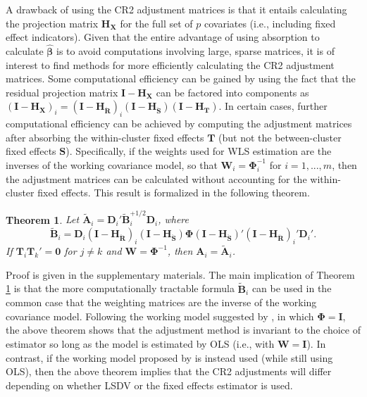 \documentclass[12pt]{article}\usepackage[]{graphicx}\usepackage[]{color}
\newtheorem{thm}{Theorem}
\newcommand{\bm}{\mathbf}
\newcommand{\bs}{\boldsymbol}
\begin{document}
A drawback of using the CR2 adjustment matrices is that it entails calculating the projection matrix $\bm{H_X}$ for the full set of $p$ covariates (i.e., including fixed effect indicators). 
Given that the entire advantage of using absorption to calculate $\hat{\bs\beta}$ is to avoid computations involving large, sparse matrices, it is of interest to find methods for more efficiently calculating the CR2 adjustment matrices. 
Some computational efficiency can be gained by using the fact that the residual projection matrix $\bm{I} - \bm{H_X}$ can be factored into components as $\left(\bm{I} - \bm{H_X}\right)_i = \left(\bm{I} - \bm{H_{\ddot{R}}}\right)_i \left(\bm{I} - \bm{H_{\ddot{S}}}\right) \left(\bm{I} - \bm{H_T}\right)$.
In certain cases, further computational efficiency can be achieved by computing the adjustment matrices after absorbing the within-cluster fixed effects $\bm{T}$ (but not the between-cluster fixed effects $\bm{S}$). 
Specifically, if the weights used for WLS estimation are the inverses of the working covariance model, so that $\bm{W}_i = \bs\Phi_i^{-1}$ for $i = 1,...,m$, then the adjustment matrices can be calculated without accounting for the within-cluster fixed effects. 
This result is formalized in the following theorem.  

\begin{thm}
\label{thm:absorb}
Let $\bm{\tilde{A}}_i = \bm{D}_i'\bm{\tilde{B}}_i^{+1/2} \bm{D}_i$, where 
\begin{equation}
\label{eq:CR2_B_tilde}
\bm{\tilde{B}}_i = \bm{D}_i\left(\bm{I} - \bm{H_{\ddot{R}}}\right)_i \left(\bm{I} - \bm{H_{\ddot{S}}}\right) \bs\Phi \left(\bm{I} - \bm{H_{\ddot{S}}}\right)' \left(\bm{I} - \bm{H_{\ddot{R}}}\right)_i' \bm{D}_i'.
\end{equation}
If $\bm{T}_i \bm{T}_k' = \bm{0}$ for $j \neq k$ and $\bm{W} = \bs\Phi^{-1}$, then $\bm{A}_i = \bm{\tilde{A}}_i$. 
\end{thm}

Proof is given in the supplementary materials.
The main implication of Theorem \ref{thm:absorb} is that the more computationally tractable formula $\bm{\tilde{B}}_i$ can be used in the common case that the weighting matrices are the inverse of the working covariance model.
Following the working model suggested by \citet{Bell2002bias}, in which $\bs\Phi = \bm{I}$, the above theorem shows that the adjustment method is invariant to the choice of estimator so long as the model is estimated by OLS (i.e., with $\bm{W} = \bm{I}$).
In contrast, if the working model proposed by \citet{Imbens2015robust} is instead used (while still using OLS), then the above theorem implies that the CR2 adjustments will differ depending on whether LSDV or the fixed effects estimator is used.
\end{document}

